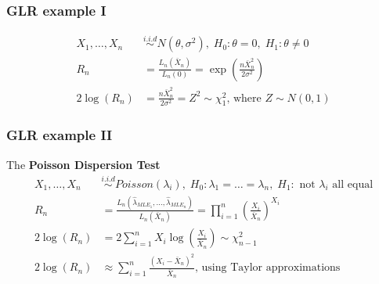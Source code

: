 \documentclass{article}
\begin{document}
\subsubsection{GLR example I}
\begin{align*}
    X_1, \dots, X_n &\overset{i.i.d}{\sim} N(\theta, \sigma^2), \; H_0:\theta=0, \; H_1:\theta \neq 0\\
    R_n &= \frac{L_n(\bar{X}_n)}{L_n(0)} = \exp\left(\frac{n\bar{X}_n^2}{2\sigma^2}\right)\\
    2\log(R_n) &= \frac{n\bar{X}_n^2}{2\sigma^2} = Z^2 \sim \chi_1^2 \textrm{, where } Z \sim N(0,1)
\end{align*}

\subsubsection{GLR example II}
The \textbf{Poisson Dispersion Test}
\begin{align*}
    X_1, \dots, X_n &\overset{i.i.d}{\sim} Poisson(\lambda_i), \; H_0:\lambda_1=\dots=\lambda_n, \; H_1: \textrm{ not $\lambda_i$ all equal}\\
    R_n &= \frac{L_n(\hat{\lambda}_{MLE_1}, \dots, \hat{\lambda}_{MLE_n})}{L_n(\bar{X}_n)} = \prod_{i=1}^n\left(\frac{X_i}{\bar{X}_n} \right)^{X_i}\\
    2\log(R_n) &= 2\sum_{i=1}^n X_i\log \left(\frac{X_i}{\bar{X}_n} \right) \sim \chi_{n-1}^2\\
    2\log(R_n) &\approx \sum_{i=1}^n \frac{(X_i - \bar{X}_n)^2}{\bar{X}_n} \textrm{, using Taylor approximations}
\end{align*}
\end{document}
